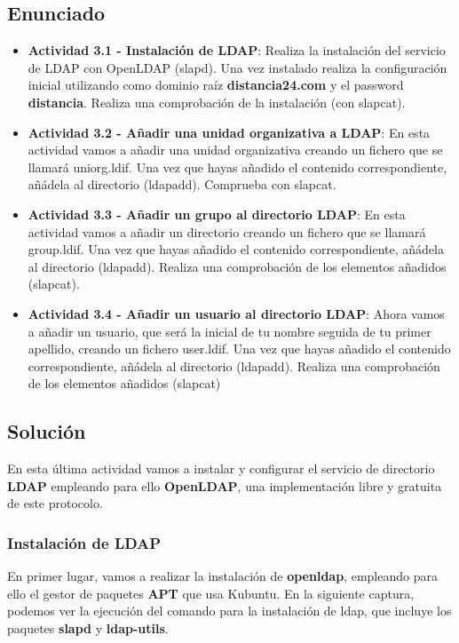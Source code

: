 \subsection{Enunciado}
\begin{itemize}
    \item \textbf{Actividad 3.1 - Instalación de LDAP}: Realiza la instalación del servicio de LDAP con OpenLDAP (slapd). Una vez instalado realiza la configuración inicial utilizando como dominio raíz \textbf{distancia24.com} y el password \textbf{distancia}. Realiza una comprobación de la instalación (con slapcat).

    \item \textbf{Actividad 3.2 - Añadir una unidad organizativa a LDAP}: En esta actividad vamos a añadir una unidad organizativa creando un fichero que se llamará uniorg.ldif. Una vez que hayas añadido el contenido correspondiente, añádela al directorio (ldapadd). Comprueba con slapcat.

    \item \textbf{Actividad 3.3 - Añadir un grupo al directorio LDAP}: En esta actividad vamos a añadir un directorio creando un fichero que se llamará group.ldif. Una vez que hayas añadido el contenido correspondiente, añádela al directorio (ldapadd). Realiza una comprobación de los elementos añadidos (slapcat).

    \item \textbf{Actividad 3.4 - Añadir un usuario al directorio LDAP}: Ahora vamos a añadir un usuario, que será la inicial de tu nombre seguida de tu primer apellido, creando un fichero user.ldif. Una vez que hayas añadido el contenido correspondiente, añádela al directorio (ldapadd). Realiza una comprobación de los elementos añadidos (slapcat)
\end{itemize}

\subsection{Solución}
En esta última actividad vamos a instalar y configurar el servicio de directorio \textbf{LDAP} empleando para ello \textbf{OpenLDAP}, una implementación libre y gratuita de este protocolo.

\subsubsection{Instalación de LDAP}
En primer lugar, vamos a realizar la instalación de \textbf{openldap}, empleando para ello el gestor de paquetes \textbf{APT} que usa Kubuntu. En la siguiente captura, podemos ver la ejecución del comando para la instalación de ldap, que incluye los paquetes \textbf{slapd} y \textbf{ldap-utils}.

